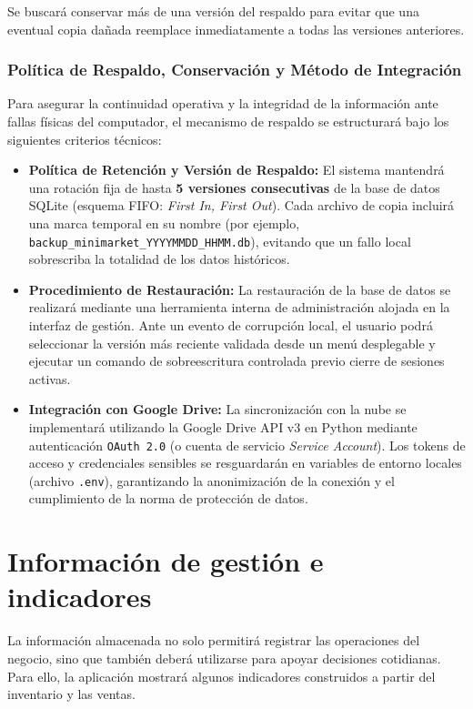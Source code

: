\documentclass[10pt,a4paper]{article}
\begin{document}
Se buscará conservar más de una versión del respaldo para evitar que una eventual copia dañada reemplace inmediatamente a todas las versiones anteriores.

\subsubsection{Política de Respaldo, Conservación y Método de Integración}

Para asegurar la continuidad operativa y la integridad de la información ante fallas físicas del computador, el mecanismo de respaldo se estructurará bajo los siguientes criterios técnicos:

\begin{itemize}
    \item \textbf{Política de Retención y Versión de Respaldo:} El sistema mantendrá una rotación fija de hasta \textbf{5 versiones consecutivas} de la base de datos SQLite (esquema FIFO: \textit{First In, First Out}). Cada archivo de copia incluirá una marca temporal en su nombre (por ejemplo, \texttt{backup\_minimarket\_YYYYMMDD\_HHMM.db}), evitando que un fallo local sobrescriba la totalidad de los datos históricos.
    \item \textbf{Procedimiento de Restauración:} La restauración de la base de datos se realizará mediante una herramienta interna de administración alojada en la interfaz de gestión. Ante un evento de corrupción local, el usuario podrá seleccionar la versión más reciente validada desde un menú desplegable y ejecutar un comando de sobreescritura controlada previo cierre de sesiones activas.
    \item \textbf{Integración con Google Drive:} La sincronización con la nube se implementará utilizando la  Google Drive API v3 en Python mediante autenticación \texttt{OAuth 2.0} (o cuenta de servicio \textit{Service Account}). Los tokens de acceso y credenciales sensibles se resguardarán en variables de entorno locales (archivo \texttt{.env}), garantizando la anonimización de la conexión y el cumplimiento de la norma de protección de datos.
\end{itemize}


\section{Información de gestión e indicadores}

La información almacenada no solo permitirá registrar las operaciones del negocio, sino que también deberá utilizarse para apoyar decisiones cotidianas. Para ello, la aplicación mostrará algunos indicadores construidos a partir del inventario y las ventas.
\end{document}
